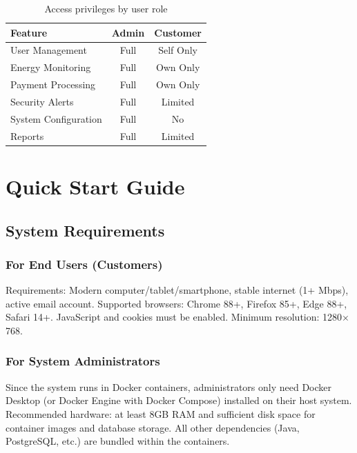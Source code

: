 \begin{table}[h]
    \centering
    \caption{Access privileges by user role}
    \label{tab:role-privileges}
    \begin{tabular}{|l|c|c|}
        \hline
        \textbf{Feature} & \textbf{Admin} & \textbf{Customer} \\
        \hline
        User Management & Full & Self Only \\
        Energy Monitoring & Full & Own Only \\
        Payment Processing & Full & Own Only \\
        Security Alerts & Full & Limited \\
        System Configuration & Full & No \\
        Reports & Full & Limited \\
        \hline
    \end{tabular}
\end{table}

\section{Quick Start Guide}
\label{sec:quick-start}

\subsection{System Requirements}
\label{subsec:system-requirements}

\subsubsection{For End Users (Customers)}
\label{subsubsec:end-user-requirements}

Requirements: Modern computer/tablet/smartphone, stable internet (1+ Mbps), active email account. Supported browsers: Chrome 88+, Firefox 85+, Edge 88+, Safari 14+. JavaScript and cookies must be enabled. Minimum resolution: 1280$\times$768.

\subsubsection{For System Administrators}
\label{subsubsec:admin-requirements}

Since the system runs in Docker containers, administrators only need Docker Desktop (or Docker Engine with Docker Compose) installed on their host system. Recommended hardware: at least 8GB RAM and sufficient disk space for container images and database storage. All other dependencies (Java, PostgreSQL, etc.) are bundled within the containers.

